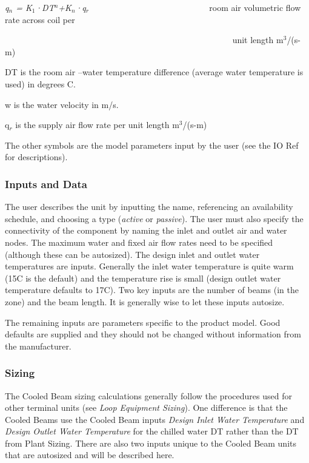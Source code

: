 \emph{q\(_{n}\) = K\(_{1}\)·DT\(^{n}\)+K\(_{n}\)·q\(_{r}\)}~~~~~~~~~~~~~~~~ ~~~~~~~~~~~ room air volumetric flow rate across coil per

~~~~~~~~~~~~~~~~~~~~~~~~~~~~~~~~~~~~~~~~~~~~~~~~~~~~~ unit length m\(^{3}\)/(s-m)

DT is the room air --water temperature difference (average water temperature is used) in degrees C.

w is the water velocity in m/s.

q\(_{r}\) is the supply air flow rate per unit length m\(^{3}\)/(s-m)

The other symbols are the model parameters input by the user (see the IO Ref for descriptions).

\subsubsection{Inputs and Data}\label{inputs-and-data-3}

The user describes the unit by inputting the name, referencing an availability schedule, and choosing a type (\emph{active} or \emph{passive}). The user must also specify the connectivity of the component by naming the inlet and outlet air and water nodes. The maximum water and fixed air flow rates need to be specified (although these can be autosized). The design inlet and outlet water temperatures are inputs. Generally the inlet water temperature is quite warm (15C is the default) and the temperature rise is small (design outlet water temperature defaults to 17C). Two key inputs are the number of beams (in the zone) and the beam length. It is generally wise to let these inputs autosize.

The remaining inputs are parameters specific to the product model. Good defaults are supplied and they should not be changed without information from the manufacturer.

\subsubsection{Sizing}\label{sizing}

The Cooled Beam sizing calculations generally follow the procedures used for other terminal units (see \emph{Loop Equipment Sizing}). One difference is that the Cooled Beams use the Cooled Beam inputs \emph{Design Inlet Water Temperature} and \emph{Design Outlet Water Temperature} for the chilled water DT rather than the DT from Plant Sizing. There are also two inputs unique to the Cooled Beam units that are autosized and will be described here.

